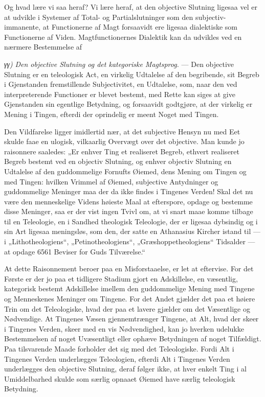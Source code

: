 \documentclass[12pt]{book}
\newcommand{\opage}[1]{\marginnote{\footnotesize\textit{[#1]}}}
\begin{document}
Og hvad lære vi saa heraf? Vi lære heraf, at den objective Slutning ligesaa vel er at udvikle i Systemer af Total- og Partialslutninger som den subjectiv-immanente, at Functionerne af Magt forsaavidt ere ligesaa dialektiske som Functionerne af Viden. Magtfunctionernes Dialektik kan da udvikles ved en nærmere Bestemmelse af

\textit{γγ)} \emph{Den objective Slutning og det kategoriske Magtsprog.} --- Den objective Slutning er en teleologisk Act, en virkelig Udtalelse af den begribende, sit Begreb i Gjenstanden fremstillende Subjectivitet, en Udtalelse, som, naar den ved interpreterende Functioner er blevet bestemt, med Rette kan siges at give Gjenstanden sin egentlige Betydning, og forsaavidt godtgjøre, at der virkelig er Mening i Tingen, efterdi der oprindelig er meent Noget med Tingen.

Den Vildfarelse ligger imidlertid nær, at det subjective Hensyn nu med Eet skulde faae en ulogisk, vilkaarlig Overvægt over det objective. Man kunde jo raisonnere saaledes: „Er enhver Ting et realiseret Begreb, ethvert realiseret Begreb bestemt ved en objectiv Slutning, og enhver objectiv Slutning en Udtalelse af den guddommelige Fornufts Øiemed, dens Mening om Tingen og med Tingen: hvilken Vrimmel af Øiemed, subjective Antydninger og guddommelige Meninger maa der da ikke findes i Tingenes Verden! Skal det nu være den menneskelige Videns høieste Maal at efterspore, opdage og bestemme disse Meninger, saa er der vist ingen Tvivl om, at vi snart maae komme tilbage til en Teleologie, en i Sandhed theologisk Teleologie, der er ligesaa dybsindig og i sin Art ligesaa meningsløs, som den, der satte en Athanasius Kircher istand til --- i „Lithotheologiens“, „Petinotheologiens“, „Græshoppetheologiens“ Tidsalder --- at opdage 6561 Beviser for Guds Tilværelse.“

\opage{425}At dette Raisonnement beroer paa en Misforstaaelse, er let at eftervise. For det Første er der jo paa et tidligere Stadium gjort en Adskillelse, en væsentlig, kategorisk bestemt Adskillelse imellem den guddommelige Mening med Tingene og Menneskenes Meninger om Tingene. For det Andet gjælder det paa et høiere Trin om det Teleologiske, hvad der paa et lavere gjælder om det Væsentlige og Nødvendige. At Tingenes Væsen gjennemtrænger Tingene, at Alt, hvad der skeer i Tingenes Verden, skeer med en vis Nødvendighed, kan jo hverken udelukke Bestemmelsen af noget Uvæsentligt eller ophæve Betydningen af noget Tilfældigt. Paa tilsvarende Maade forholder det sig med det Teleologiske. Fordi Alt i Tingenes Verden underlægges Teleologien, efterdi Alt i Tingenes Verden underlægges den objective Slutning, deraf følger ikke, at hver enkelt Ting i al Umiddelbarhed skulde som særlig opnaaet Øiemed have særlig teleologisk Betydning.
\end{document}
